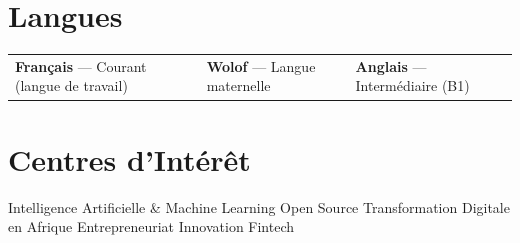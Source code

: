\documentclass[a4paper,11pt]{article}
\begin{document}
\section{ Langues}

\begin{tabularx}{\textwidth}{@{}XXX@{}}
    \textbf{Français} — Courant (langue de travail) &
    \textbf{Wolof} — Langue maternelle &
    \textbf{Anglais} — Intermédiaire (B1)
\end{tabularx}

\section{ Centres d'Intérêt}

Intelligence Artificielle \& Machine Learning \quad\textbar\quad Open Source \quad\textbar\quad Transformation Digitale en Afrique \quad\textbar\quad Entrepreneuriat \quad\textbar\quad Innovation Fintech
\end{document}
